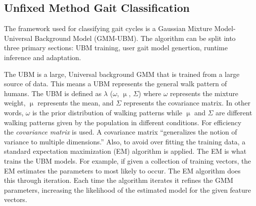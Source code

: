 \documentclass{sig-alternate}
\begin{document}
	

\subsection{Unfixed Method Gait Classification}
The framework used for classifying gait cycles is a Gaussian Mixture Model-Universal Background Model (GMM-UBM). The algorithm can be split into three primary sections: UBM training, user gait model genertion, runtime inference and adaptation. 

	 The UBM is a large, Universal background GMM that is trained from a large source of data. This means a UBM represents the general walk pattern of humans. The UBM is defined as 
\begin{math} \lambda \end{math} (\begin{math} \omega \end{math},
\begin{math} \upmu \end{math},
\begin{math} \Sigma \end{math}) where
\begin{math} \omega \end{math} represents the mixture weight, \begin{math} \upmu \end{math} represents the mean, and \begin{math} \Sigma \end{math} represents the covariance matrix. In other words, \begin{math} \omega \end{math} is the prior distribution of walking patterns while \begin{math} \upmu \end{math} and \begin{math} \Sigma \end{math} are different walking patterns given by the population in different conditions. For efficiency the \textit{covariance matrix} is used. A covariance matrix ``generalizes the notion of variance to multiple dimensions.'' Also, to avoid over fitting the training data, a standard expectation maximization (EM) algorithm is applied. The EM is what trains the UBM models. For example, if given a collection of training vectors, the EM estimates the parameters to most likely to occur. The EM algorithm does this through iteration. Each time the algorithm iterates it refines the GMM parameters, increasing the likelihood of the estimated model for the given feature vectors. 
\end{document}
